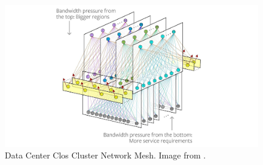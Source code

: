 \begin{figure} [!h]
\centering
\includegraphics[scale=.7]{methodology/images/fb_clos.png}
\caption[DC Clos Network]{Data Center Clos Cluster Network Mesh. Image from  \cite{fb_clos}.}
\label{img_fb_clos}
\end{figure}